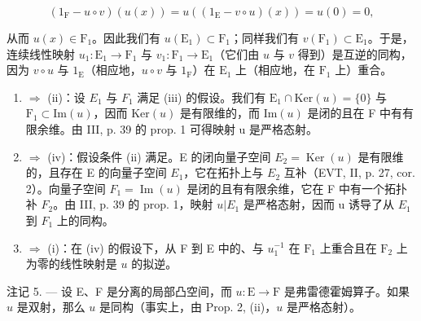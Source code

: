 \[
(1 _ {\mathrm{F}} - u \circ v) (u (x)) = u ((1 _ {\mathrm{E}} - v \circ u) (x)) = u (0) = 0,
\]

从而 \(u(x) \in \mathrm{F}_1\)。因此我们有 \(u(\mathrm{E}_1) \subset \mathrm{F}_1\)；同样我们有 \(v(\mathrm{F}_1) \subset \mathrm{E}_1\)。于是，连续线性映射 \(u_1: \mathrm{E}_1 \to \mathrm{F}_1\) 与 \(v_1: \mathrm{F}_1 \to \mathrm{E}_1\)（它们由 \(u\) 与 \(v\) 得到）是互逆的同构，因为 \(v \circ u\) 与 \(1_{\mathrm{E}}\)（相应地，\(u \circ v\) 与 \(1_{\mathrm{F}}\)）在 \(\mathrm{E}_1\) 上（相应地，在 \(\mathrm{F}_1\) 上）重合。

\begin{enumerate}
\def\labelenumi{(\roman{enumi})}
\setcounter{enumi}{2}
\item
  \(\Longrightarrow\) (ii)：设 \(E_{1}\) 与 \(F_{1}\) 满足 (iii) 的假设。我们有 \(\mathrm{E}_{1}\cap\mathrm{Ker}(u)=\{0\}\) 与 \(\mathrm{F}_{1}\subset\mathrm{Im}(u)\)，因而 \(\mathrm{Ker}(u)\) 是有限维的，而 \(\mathrm{Im}(u)\) 是闭的且在 F 中有有限余维。由 III, p. 39 的 prop. 1 可得映射 u 是严格态射。
\item
   \(\Longrightarrow\) (iv)：假设条件 (ii) 满足。E 的闭向量子空间 \(E_{2} = \operatorname{Ker}(u)\) 是有限维的，且存在 E 的向量子空间 \(E_{1}\)，它在拓扑上与 \(E_{2}\) 互补（EVT, II, p. 27, cor. 2）。向量子空间 \(F_{1} = \operatorname{Im}(u)\) 是闭的且有有限余维，它在 F 中有一个拓扑补 \(F_{2}\)。由 III, p. 39 的 prop. 1，映射 \(u|E_{1}\) 是严格态射，因而 u 诱导了从 \(E_{1}\) 到 \(F_{1}\) 上的同构。
\item
   \(\Longrightarrow\) (i)：在 (iv) 的假设下，从 F 到 E 中的、与 \(u_1^{-1}\) 在 \(\mathrm{F}_1\) 上重合且在 \(\mathrm{F}_2\) 上为零的线性映射是 \(u\) 的拟逆。
\end{enumerate}

注记 5. --- 设 E、F 是分离的局部凸空间，而 \(u\colon\mathrm{E}\to\mathrm{F}\) 是弗雷德霍姆算子。如果 \(u\) 是双射，那么 \(u\) 是同构（事实上，由 Prop. 2, (ii)，\(u\) 是严格态射）。

